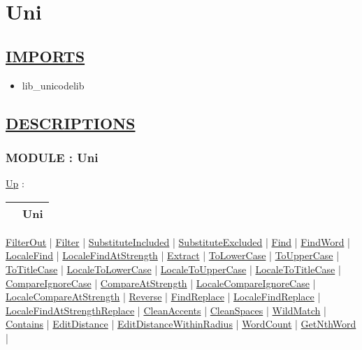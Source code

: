 \chapter*{Uni}
\hypertarget{ecldoc:toc:Uni}{}

\section*{\underline{IMPORTS}}
\begin{itemize}
\item lib\_unicodelib
\end{itemize}

\section*{\underline{DESCRIPTIONS}}
\subsection*{MODULE : Uni}
\hypertarget{ecldoc:Uni}{}
\hyperlink{ecldoc:toc:root}{Up} :

{\renewcommand{\arraystretch}{1.5}
\begin{tabularx}{\textwidth}{|>{\raggedright\arraybackslash}l|X|}
\hline
\hspace{0pt} & Uni \\
\hline
\end{tabularx}
}

\par


\hyperlink{ecldoc:uni.filterout}{FilterOut}  |
\hyperlink{ecldoc:uni.filter}{Filter}  |
\hyperlink{ecldoc:uni.substituteincluded}{SubstituteIncluded}  |
\hyperlink{ecldoc:uni.substituteexcluded}{SubstituteExcluded}  |
\hyperlink{ecldoc:uni.find}{Find}  |
\hyperlink{ecldoc:uni.findword}{FindWord}  |
\hyperlink{ecldoc:uni.localefind}{LocaleFind}  |
\hyperlink{ecldoc:uni.localefindatstrength}{LocaleFindAtStrength}  |
\hyperlink{ecldoc:uni.extract}{Extract}  |
\hyperlink{ecldoc:uni.tolowercase}{ToLowerCase}  |
\hyperlink{ecldoc:uni.touppercase}{ToUpperCase}  |
\hyperlink{ecldoc:uni.totitlecase}{ToTitleCase}  |
\hyperlink{ecldoc:uni.localetolowercase}{LocaleToLowerCase}  |
\hyperlink{ecldoc:uni.localetouppercase}{LocaleToUpperCase}  |
\hyperlink{ecldoc:uni.localetotitlecase}{LocaleToTitleCase}  |
\hyperlink{ecldoc:uni.compareignorecase}{CompareIgnoreCase}  |
\hyperlink{ecldoc:uni.compareatstrength}{CompareAtStrength}  |
\hyperlink{ecldoc:uni.localecompareignorecase}{LocaleCompareIgnoreCase}  |
\hyperlink{ecldoc:uni.localecompareatstrength}{LocaleCompareAtStrength}  |
\hyperlink{ecldoc:uni.reverse}{Reverse}  |
\hyperlink{ecldoc:uni.findreplace}{FindReplace}  |
\hyperlink{ecldoc:uni.localefindreplace}{LocaleFindReplace}  |
\hyperlink{ecldoc:uni.localefindatstrengthreplace}{LocaleFindAtStrengthReplace}  |
\hyperlink{ecldoc:uni.cleanaccents}{CleanAccents}  |
\hyperlink{ecldoc:uni.cleanspaces}{CleanSpaces}  |
\hyperlink{ecldoc:uni.wildmatch}{WildMatch}  |
\hyperlink{ecldoc:uni.contains}{Contains}  |
\hyperlink{ecldoc:uni.editdistance}{EditDistance}  |
\hyperlink{ecldoc:uni.editdistancewithinradius}{EditDistanceWithinRadius}  |
\hyperlink{ecldoc:uni.wordcount}{WordCount}  |
\hyperlink{ecldoc:uni.getnthword}{GetNthWord}  |

